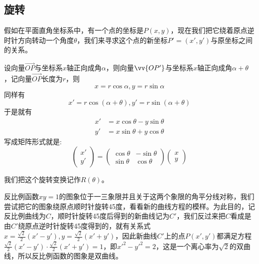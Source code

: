 \subsection{旋转}
假如在平面直角坐标系中，有一个点的坐标是$P(x,y)$，现在我们把它绕着原点逆时针方向转动一个角度$\theta$，我们来寻求这个点的新坐标$P'=(x', y')$与原坐标之间的关系。

设向量$\overrightarrow{OP}$与坐标系$x$轴正向成角$\alpha$，则向量$\vv{OP'}$与坐标系$x$轴正向成角$\alpha+\theta$，记向量$\overrightarrow{OP}$长度为$r$，则
\begin{equation*}
  x=r\cos{\alpha},y=r\sin{\alpha}
\end{equation*}
同样有
\begin{equation*}
  x'=r\cos{(\alpha+\theta)},y'=r\sin{(\alpha+\theta)}
\end{equation*}
于是就有
\begin{equation}
  \label{eq:formulas-rotation-axias}
  \begin{split}
  x' & = x\cos{\theta} - y\sin{\theta} \\
  y' & = x\sin{\theta} + y\cos{\theta}
  \end{split}
\end{equation}
写成矩阵形式就是:
\begin{equation*}
  \left(
    \begin{array}{c}
      x' \\
      y'
    \end{array}
  \right)
    =
    \left(
      \begin{array}{cc}
        \cos{\theta} & -\sin{\theta} \\
        \sin{\theta} & \cos{\theta}
      \end{array}
    \right)
  \left(
    \begin{array}{c}
      x \\
      y
    \end{array}
  \right)
\end{equation*}

我们把这个旋转变换记作$R(\theta)$。

\begin{example}
  反比例函数$xy=1$的图象位于一三象限并且关于这两个象限的角平分线对称，我们尝试把它的图象绕原点顺时针旋转45度，看看新的曲线方程的模样。为此目的，记反比例曲线为$C$，顺时针旋转45度后得到的新曲线记为$C'$，我们反过来把$C$看成是由$C'$绕原点逆时针旋转45度得到的，就有关系式$x=\frac{\sqrt{2}}{2}(x'-y'), y=\frac{\sqrt{2}}{2}(x'+y')$，因此新曲线$C'$上的点$P(x',y')$都满足方程$\frac{\sqrt{2}}{2}(x'-y') \cdot \frac{\sqrt{2}}{2}(x'+y')=1$，即$x'^2-y'^2=2$，这是一个离心率为$\sqrt{2}$的双曲线，所以反比例函数的图象是双曲线。
\end{example}

